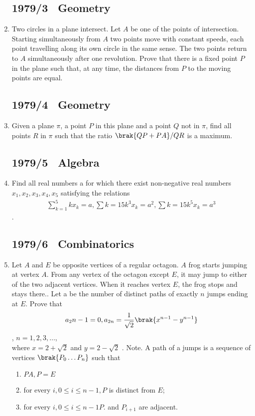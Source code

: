 \documentclass[12pt,-letter paper] {article}
\begin{document}
\begin{enumerate}
\subsection*{1979/3 \ Geometry}
	\item Two circles in a plane intersect. Let $A$ be one of the points of intersection. Starting simultaneously from $A$ two points move with constant speeds, each point travelling along its own circle in the same sense. The two points return to $A$ simultaneously after one revolution. Prove that there is a fixed point $P$ in the plane such that, at any time, the distances from $P$ to the moving points are equal.
\subsection*{1979/4 \ Geometry}
\item Given a plane $\pi$, a point $P$ in this plane and a point $Q$ not in $\pi$, find all points $R$ in $\pi$ such that the ratio $\brak{QP+PA}/QR$ is a maximum. 
\subsection*{1979/5 \ Algebra}
\item Find all real numbers a for which there exist non-negative real numbers $x_1, x_2, x_3, x_4, x_5$ satisfying the relations \begin{align}\sum_{k=1}^{5}kx_{k}=a,\sum{k=1}{5}k^{3}x_{k}=a^2,\sum{k=1}{5}k^{5}x_{k}=a^3\end{align}.
		\subsection*{1979/6 \ Combinatorics}
	\item Let $A$ and $E$ be opposite vertices of a regular octagon. $A$ frog starts jumping at vertex $A$. From any vertex of the octagon except $E$, it may jump to either of the two adjacent vertices. When it reaches vertex $E$, the frog stops and stays there.. Let a be the number of distinct paths of exactly $n$ jumps ending at $E$. Prove that 
\begin{align}a_2n-1=0, a_{2n} = \frac{1}{\sqrt{2}}\brak{x^{n - 1} - y^{n - 1}}\end{align},
$n = 1, 2, 3 ,\ldots$,\\
	where $x = 2 + \sqrt{2}$ and $y = 2 - \sqrt{2}$ . Note. A path of a jumps is a sequence of vertices $\brak{P_0\ldots P_n}$ such that
\begin{enumerate}
	\item $PA, P = E$
\item for every $i, 0 \leq i \leq n - 1, P$ is distinct from $E$;
\item for every $i, 0 \leq i \leq n - 1 P$. and $P_{i+1}$ are adjacent.\end{enumerate}
\end{enumerate}
\end{document}
